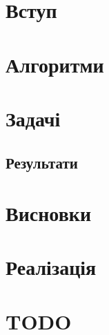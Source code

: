 \documentclass[a4paper,14pt,openany,twoside,oldfontcommands]{memoir}
\begin{document}

\newpage

\setcounter{page}{2}


\newpage

\setcounter{tocdepth}{3}
\tableofcontents*
\newpage

\chapter{Вступ}


\chapter{Алгоритми}


\chapter{Задачі}


\begin{landscape}
\chapter{Результати}

\end{landscape}

\chapter{Висновки}


\newpage
\nocite{*}



\chapter{Реалізація}


\chapter{TODO}

\end{document}
